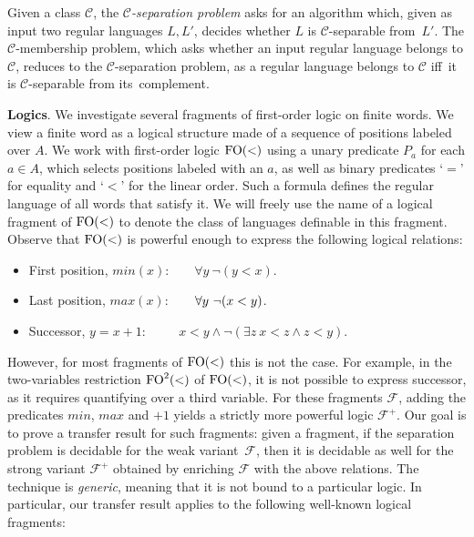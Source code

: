\documentclass[a4paper,USenglish]{lipics}
\newcommand\Fs{\ensuremath{\mathcal{F}}\xspace}
\newcommand\Cs{\ensuremath{\mathcal{C}}\xspace}
\newcommand{\fow}{\ensuremath{\textup{FO}(<)}\xspace}
\newcommand{\fod}{\ensuremath{\textup{FO}^2(<)}\xspace}
\newcommand\highlight[1]{\par\bigskip\noindent\textbf{\sffamily #1}.}
\theoremstyle{plain}
\begin{document}
Given a class \Cs, the \emph{\Cs-separation problem} asks for an algorithm
which, given as input two regular languages $L,L'$, decides whether $L$ is
\Cs-separable from~$L'$. The \Cs-membership problem, which asks whether
an input regular language belongs to \Cs, reduces to the \Cs-separation
problem, as a regular language belongs to \Cs iff\ it is \Cs-separable
from its~complement.

\highlight{Logics} We investigate several fragments of
first-order logic on finite words. We view a finite word as a logical
structure made of a sequence of positions labeled over $A$. We work with
first-order logic \fow using a unary predicate $P_a$ for each $a \in A$, which
selects positions labeled with an $a$, as well as binary predicates `$=$' for
equality and `$<$' for the linear order. Such a formula defines the regular
language of all words that satisfy it. We will freely use the name of a
logical fragment of \fow to denote the class of languages definable in this
fragment. Observe that \fow is powerful enough to express the following
logical relations:
\begin{itemize}
\item First position, $min(x)$:$\qquad \forall y\ \neg (y < x)$.
\item Last position, $max(x)$:$\hspace*{4.75ex} \forall y\ \neg (x < y)$.
\item Successor, $y = x+1$:$\qquad\ \ \, x < y \wedge \neg (\exists z\ x< z \wedge z <y)$.
\end{itemize}

However, for most fragments of \fow this is not the case. For example,
in the two-variables restriction \fod of \fow, it is not possible to
express successor, as it requires quantifying over a third
variable. For these fragments $\Fs$, adding the predicates $min$,
$max$ and $+1$ yields a strictly more powerful logic $\Fs^+$. Our goal
is to prove a transfer result for such fragments: given a fragment, if
the separation problem is decidable for the weak variant~$\Fs$, then it
is decidable as well for the strong variant $\Fs^+$ obtained by
enriching $\Fs$ with the above relations. The technique is
\emph{generic}, meaning that it is not bound to a particular logic. In
particular, our transfer result applies to the following well-known
logical fragments:
\end{document}
